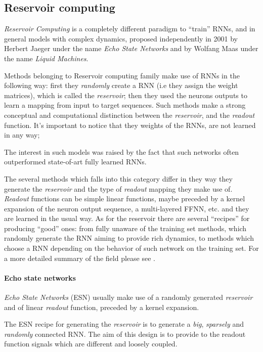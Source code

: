 \subsection{Reservoir computing} 
\label{sec:reservoir}

\textit{Reservoir Computing} is a completely different paradigm to ``train'' RNNs, and in general models with complex 
dynamics, proposed independently in 2001 by Herbert Jaeger under the name \textit{Echo State 
Networks}\cite{echoStateNetworks} and by Wolfang Maas under the name \textit{Liquid Machines}\cite{liquidStateMachines}.

Methods belonging to Reservoir computing family make use of RNNs in the following way: first they \textit{randomly} 
create a RNN (i.e they assign the weight matrices), which is called the \textit{reservoir}; then they used the neurons
outputs to learn a mapping from input to target sequences.
Such methods make a strong conceptual and computational distinction between the \textit{reservoir}, and the 
\textit{readout} function.
It's important to notice that they weights of the RNNs, are not learned in any way;

The interest in such models was raised by the fact that such networks often outperformed state-of-art fully learned 
RNNs.


The several methods which falls into this category differ in they way they generate the \textit{reservoir} and the type 
of \textit{readout} mapping they make use of. \textit{Readout} functions can be simple linear functions, maybe preceded 
by a kernel expansion of the neuron output sequence, a multi-layered FFNN, etc. and they are learned in the usual way.
As for the reservoir there are several ``recipes'' for producing ``good'' ones: from fully unaware of the training set 
methods, which randomly generate the RNN aiming to provide rich dynamics, to methods which choose a RNN depending on 
the behavior of such network on the training set.
For a more detailed summary of the field please see \cite{reservoirSummary}.


\paragraph{Echo state networks}

\textit{Echo State Networks} (ESN) usually make use of a randomly generated \textit{reservoir} and of linear 
\textit{readout} function, preceded by a kernel expansion.

The ESN recipe for generating the \textit{reservoir} is to generate a \textit{big}, \textit{sparsely} and 
\textit{randomly} connected RNN. The aim of this design is to provide to the readout function signals which are 
different and loosely coupled.

